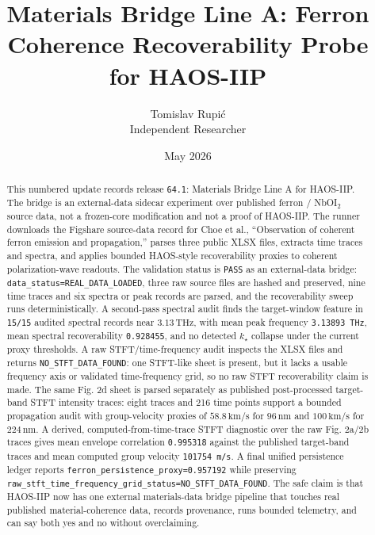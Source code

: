 \documentclass[11pt]{article}
\title{Materials Bridge Line A: Ferron Coherence Recoverability Probe for HAOS-IIP}
\author{Tomislav Rupi\'c \\ Independent Researcher}
\date{May 2026}
\begin{document}
\maketitle

\begin{abstract}
This numbered update records release \texttt{64.1}: Materials Bridge Line A for HAOS-IIP. The bridge is an external-data sidecar experiment over published ferron / NbOI$_2$ source data, not a frozen-core modification and not a proof of HAOS-IIP. The runner downloads the Figshare source-data record for Choe et al., ``Observation of coherent ferron emission and propagation,'' parses three public XLSX files, extracts time traces and spectra, and applies bounded HAOS-style recoverability proxies to coherent polarization-wave readouts. The validation status is \texttt{PASS} as an external-data bridge: \texttt{data\_status=REAL\_DATA\_LOADED}, three raw source files are hashed and preserved, nine time traces and six spectra or peak records are parsed, and the recoverability sweep runs deterministically. A second-pass spectral audit finds the target-window feature in \texttt{15/15} audited spectral records near \(3.13\,\mathrm{THz}\), with mean peak frequency \texttt{3.13893 THz}, mean spectral recoverability \texttt{0.928455}, and no detected \(k_\star\) collapse under the current proxy thresholds. A raw STFT/time-frequency audit inspects the XLSX files and returns \texttt{NO\_STFT\_DATA\_FOUND}: one STFT-like sheet is present, but it lacks a usable frequency axis or validated time-frequency grid, so no raw STFT recoverability claim is made. The same Fig. 2d sheet is parsed separately as published post-processed target-band STFT intensity traces: eight traces and 216 time points support a bounded propagation audit with group-velocity proxies of \(58.8\,\mathrm{km/s}\) for \(96\,\mathrm{nm}\) and \(100\,\mathrm{km/s}\) for \(224\,\mathrm{nm}\). A derived, computed-from-time-trace STFT diagnostic over the raw Fig. 2a/2b traces gives mean envelope correlation \texttt{0.995318} against the published target-band traces and mean computed group velocity \texttt{101754 m/s}. A final unified persistence ledger reports \texttt{ferron\_persistence\_proxy=0.957192} while preserving \texttt{raw\_stft\_time\_frequency\_grid\_status=NO\_STFT\_DATA\_FOUND}. The safe claim is that HAOS-IIP now has one external materials-data bridge pipeline that touches real published material-coherence data, records provenance, runs bounded telemetry, and can say both yes and no without overclaiming.
\end{abstract}
\end{document}
